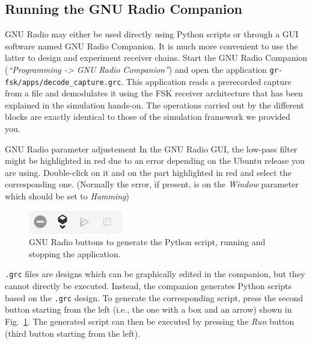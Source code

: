 
\subsection{Running the GNU Radio Companion}

GNU Radio may either be used directly using Python scripts or through a GUI software named GNU Radio Companion. It is much more convenient to use the latter to design and experiment receiver chains.
Start the GNU Radio Companion (\textit{``Programming -> GNU Radio Companion''}) and open the application \texttt{gr-fsk/apps/decode\_capture.grc}.
This application reads a prerecorded capture from a file
and demodulates it using the FSK receiver architecture that has been explained in the simulation hands-on. The operations carried out by the different blocks are exactly identical to those of the simulation framework we provided you.

\begin{bclogo}[couleur = gray!20, arrondi = 0.2, logo=\bcinfo]{GNU Radio parameter adjustement}
    In the GNU Radio GUI, the low-pass filter might be highlighted in red due to an error depending on the Ubuntu release you are using. Double-click on it and on the part highlighted in red and select the corresponding one. (Normally the error, if present, is on the \textit{Window} parameter which should be set to \textit{Hamming})
\end{bclogo}

\begin{figure}[H]
    \centering
    \includegraphics[scale=1]{figures/buttons.PNG}
    \caption{GNU Radio buttons to generate the Python script, running and stopping the application.}
    \label{fig:buttons}
\end{figure}
\texttt{.grc} files are designs which can be graphically edited in the companion, but they cannot directly be executed.
Instead, the companion generates Python scripts based on the \texttt{.grc} design. To generate the corresponding script, press the second button starting from the left (i.e., the one with a box and an arrow) shown in Fig.~\ref{fig:buttons}.
The generated script can then be executed by pressing the \textit{Run} button (third button starting from the left).

